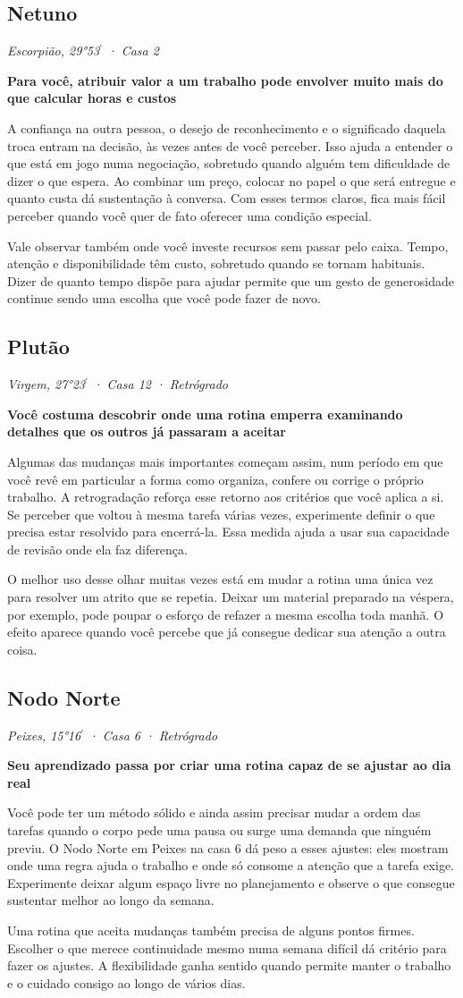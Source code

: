 \documentclass[11pt,a4paper]{article}
\newcommand{\leitura}[3]{\subsection{#1}\textit{#2}\par #3}
\newcommand{\subtituloleitura}[1]{\textbf{#1}\par\nopagebreak[4]}
\begin{document}
\leitura{Netuno}{Escorpião, 29°53\ensuremath{^{\prime}} · Casa 2}{
\subtituloleitura{Para você, atribuir valor a um trabalho pode envolver muito mais do que calcular horas e custos} A confiança na outra pessoa, o desejo de reconhecimento e o significado daquela troca entram na decisão, às vezes antes de você perceber. Isso ajuda a entender o que está em jogo numa negociação, sobretudo quando alguém tem dificuldade de dizer o que espera. Ao combinar um preço, colocar no papel o que será entregue e quanto custa dá sustentação à conversa. Com esses termos claros, fica mais fácil perceber quando você quer de fato oferecer uma condição especial.

Vale observar também onde você investe recursos sem passar pelo caixa. Tempo, atenção e disponibilidade têm custo, sobretudo quando se tornam habituais. Dizer de quanto tempo dispõe para ajudar permite que um gesto de generosidade continue sendo uma escolha que você pode fazer de novo.
}

\leitura{Plutão}{Virgem, 27°23\ensuremath{^{\prime}} · Casa 12 · Retrógrado}{
\subtituloleitura{Você costuma descobrir onde uma rotina emperra examinando detalhes que os outros já passaram a aceitar} Algumas das mudanças mais importantes começam assim, num período em que você revê em particular a forma como organiza, confere ou corrige o próprio trabalho. A retrogradação reforça esse retorno aos critérios que você aplica a si. Se perceber que voltou à mesma tarefa várias vezes, experimente definir o que precisa estar resolvido para encerrá-la. Essa medida ajuda a usar sua capacidade de revisão onde ela faz diferença.

O melhor uso desse olhar muitas vezes está em mudar a rotina uma única vez para resolver um atrito que se repetia. Deixar um material preparado na véspera, por exemplo, pode poupar o esforço de refazer a mesma escolha toda manhã. O efeito aparece quando você percebe que já consegue dedicar sua atenção a outra coisa.
}

\leitura{Nodo Norte}{Peixes, 15°16\ensuremath{^{\prime}} · Casa 6 · Retrógrado}{
\subtituloleitura{Seu aprendizado passa por criar uma rotina capaz de se ajustar ao dia real} Você pode ter um método sólido e ainda assim precisar mudar a ordem das tarefas quando o corpo pede uma pausa ou surge uma demanda que ninguém previu. O Nodo Norte em Peixes na casa 6 dá peso a esses ajustes: eles mostram onde uma regra ajuda o trabalho e onde só consome a atenção que a tarefa exige. Experimente deixar algum espaço livre no planejamento e observe o que consegue sustentar melhor ao longo da semana.

Uma rotina que aceita mudanças também precisa de alguns pontos firmes. Escolher o que merece continuidade mesmo numa semana difícil dá critério para fazer os ajustes. A flexibilidade ganha sentido quando permite manter o trabalho e o cuidado consigo ao longo de vários dias.
}
\end{document}
